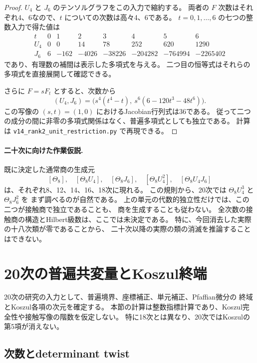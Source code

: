 \documentclass[a4paper,11pt]{ltjsarticle}
\theoremstyle{definition}
\begin{document}
\begin{proof}
$U_4$ と $J_6$ のテンソルグラフをこの入力で縮約する。
両者の $F$ 次数はそれぞれ4、6なので、$t$ についての次数は高々4、6である。
$t=0,1,\ldots,6$ の七つの整数入力で得た値は
\[
\begin{array}{c|rrrrrrr}
t&0&1&2&3&4&5&6\\\hline
U_4&0&0&14&78&252&620&1290\\
J_6&6&-162&-4026&-38226&-204282&-764994&-2265402
\end{array}
\]
であり、有理数の補間は表示した多項式を与える。
二つ目の恒等式はそれらの多項式を直接展開して確認できる。

さらに $F=sF_t$ とすると、次数から
\[
 (U_4,J_6)=\bigl(s^4(t^4-t),\ s^6(6-120t^3-48t^6)\bigr).
\]
この写像の $(s,t)=(1,0)$ におけるJacobian行列式は36である。
従って二つの成分の間に非零の多項式関係はなく、普遍多項式としても独立である。
計算は \texttt{v14\_rank2\_unit\_restriction.py} で再現できる。
\end{proof}

\paragraph{二十次に向けた作業仮説.}
既に決定した通常商の生成元
\[
 [\Theta_8],\quad[\Theta_8U_4],\quad[\Theta_8J_6],\quad
 [\Theta_8U_4^2],\quad[\Theta_8U_4J_6]
\]
は、それぞれ8、12、14、16、18次に現れる。
この規則から、20次では $\Theta_8U_4^3$ と $\Theta_8J_6^2$ を
まず調べるのが自然である。
上の単元の代数的独立性だけでは、この二つが接触商で独立であることも、
商を生成することも従わない。
全次数の接触商の構造とHilbert級数は、ここでは未決定である。
特に、今回消去した実際の十八次類が零であることから、
二十次以降の実際の類の消滅を推論することはできない。


\clearpage
\section{20次の普遍共変量とKoszul終端}
\label{sec:v15-twentieth-characters}

20次の研究の入力として、普遍境界、座標補正、単元補正、Pfaffian微分の
終域とKoszul各項の次元を確定する。
本節の計算は整数指標計算であり、Koszul完全性や接触写像の階数を仮定しない。
特に18次とは異なり、20次ではKoszulの第5項が消えない。

\subsection{次数とdeterminant twist}
\end{document}
